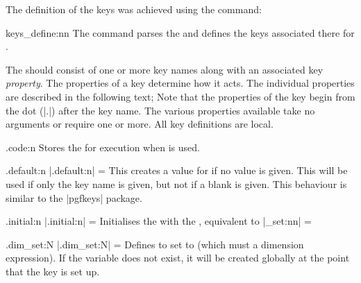  
 
 The definition of the keys was achieved using the command:
 
\begin{docCommand}{keys_define:nn}{}
The command parses the  and defines the keys associated there for . 
\end{docCommand}

The  should consist of one or more key names along with an associated
key \emph{property}. The properties of a key determine how it acts. The individual properties
are described in the following text; Note that the properties of the key begin from the dot (|.|) after the key name. The various properties available take no arguments or require one or more. All key definitions are local. 
 
 \begin{margoptionslist}
 \item [ .code:n] Stores the  for execution when  is used. 
 \item [.default:n]  |.default:n| =  This creates a  value for  if no value is given. This will be used if only the key name is given, but not if a blank  is given. This behaviour is similar to the |pgfkeys| package.
 \item [.initial:n]  |.initial:n| =  Initialises the  with the , equivalent to
|\keys_set:nn|   = 
 
 \item [.dim_set:N]  |.dim_set:N| =  Defines  to set  to  (which must a dimension expression). If the variable does not exist, it will be created globally at the point that the key is set up.
 \end{margoptionslist}
 
